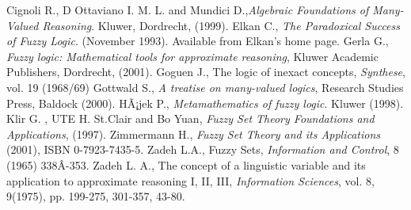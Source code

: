 \documentclass[12pt]{article}
\begin{document}
\begin{thebibliography}{9}
 Cignoli R., D Ottaviano I. M. L. and Mundici D.,{\em Algebraic Foundations of Many-Valued Reasoning}. Kluwer, Dordrecht, (1999).
 Elkan C., {\em The Paradoxical Success of Fuzzy Logic}. (November 1993). Available from  Elkan's home page.
 Gerla G., {\em Fuzzy logic: Mathematical tools for approximate reasoning}, Kluwer Academic Publishers, Dordrecht, (2001).
 Goguen J., The logic of inexact concepts,  {\em Synthese}, vol. 19 (1968/69)
 Gottwald S., {\em A treatise on many-valued logics}, Research Studies Press, Baldock (2000).
 HÃ¡jek P., {\em Metamathematics of fuzzy logic}. Kluwer (1998).
 Klir G. , UTE H. St.Clair and Bo Yuan, {\em Fuzzy Set Theory Foundations and Applications}, (1997).
 Zimmermann H., {\em Fuzzy Set Theory and its Applications} (2001), ISBN 0-7923-7435-5.
 Zadeh L.A., Fuzzy Sets, {\em Information and Control}, 8 (1965) 338Â­-353.
 Zadeh L. A., The concept of a linguistic variable and its application to approximate reasoning I, II, III, {\em Information Sciences}, vol. 8, 9(1975), pp. 199-275, 301-357, 43-80.
\end{thebibliography}
\end{document}
